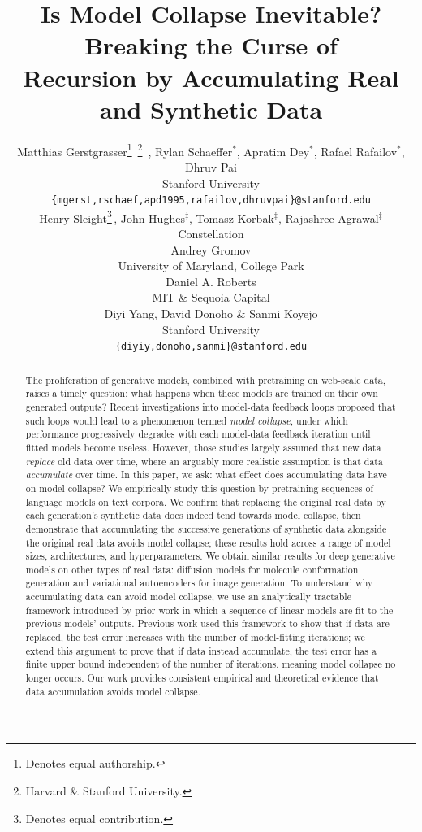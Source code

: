 \documentclass{article} %
\title{Is Model Collapse Inevitable? Breaking the Curse of\\ Recursion by Accumulating Real and Synthetic Data}
\author{Matthias Gerstgrasser\thanks{Denotes equal authorship.}\, \thanks{Harvard \& Stanford University.} \,, Rylan Schaeffer$^*$, Apratim Dey$^*$, Rafael Rafailov$^*$, Dhruv Pai \\
Stanford University \\
\texttt{\{mgerst,rschaef,apd1995,rafailov,dhruvpai\}@stanford.edu} \\
\AND
Henry Sleight\thanks{Denotes equal contribution.}\,, John Hughes$^{\ddag}$, Tomasz Korbak$^{\ddag}$, Rajashree Agrawal$^{\ddag}$\\
Constellation \\
\AND
Andrey Gromov\\
University of Maryland, College Park \\
\AND
Daniel A. Roberts\\
MIT \& Sequoia Capital\\
\AND
Diyi Yang, David Donoho \& Sanmi Koyejo\\
Stanford University\\
\texttt{\{diyiy,donoho,sanmi\}@stanford.edu} \\
}
\newcommand{\replace}[1]{#1}
\newcommand{\accumulate}[1]{#1}
\begin{document}
\maketitle

\begin{abstract}
The proliferation of generative models, combined with pretraining on web-scale data, raises a timely question: what happens when these models are trained on their own generated outputs? Recent investigations into model-data feedback loops proposed that such loops would lead to a phenomenon termed \textit{model collapse}, under which performance progressively degrades with each model-data feedback iteration until fitted models become useless. However, those studies largely assumed that new data \textit{\replace{replace}} old data over time, where an arguably more realistic assumption is that data \textit{\accumulate{accumulate}} over time. In this paper, we ask: what effect does accumulating data have on model collapse? 
We empirically study this question by pretraining sequences of language models on text corpora. We confirm that \replace{replacing the original real data by each generation's synthetic data does indeed tend towards model collapse}, then demonstrate that \accumulate{accumulating the successive generations of synthetic data alongside the original real data avoids model collapse}; these results hold across a range of model sizes, architectures, and hyperparameters. We obtain similar results for deep generative models on other types of real data: diffusion models for molecule conformation generation and variational autoencoders for image generation. To understand why accumulating data can avoid model collapse, we use an analytically tractable framework introduced by prior work in which a sequence of linear models are fit to the previous models' outputs. Previous work used this framework to show that \replace{if data are replaced, the test error increases with the number of model-fitting iterations}; we extend this argument to prove that \accumulate{if data instead accumulate}, the test error has a finite upper bound independent of the number of iterations, meaning \accumulate{model collapse no longer occurs}. 
Our work provides consistent empirical and theoretical evidence that \accumulate{data accumulation avoids model collapse}.
\end{abstract}






\clearpage




\clearpage
\appendix

\end{document}
